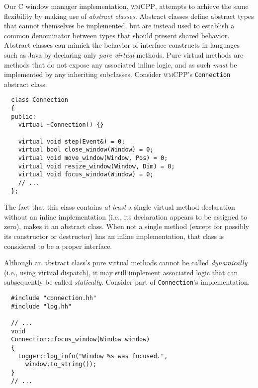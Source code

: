 Our  C\text{++}  window  manager  implementation,  \textsc{wmCPP},  attempts  to
achieve  the  same  flexibility  by making  use  of  \textit{abstract  classes}.
Abstract classes  define abstract types  that cannot themselves  be implemented,
but  are instead  used  to establish  a common  denominator  between types  that
should  present shared  behavior. Abstract  classes can  mimick the  behavior of
interface constructs  in languages such  as Java by declaring  only \textit{pure
virtual}  methods. Pure  virtual  methods are  methods that  do  not expose  any
associated  inline  logic, and  as  such  \textit{must}  be implemented  by  any
inheriting  subclasses.  Consider \textsc{wmCPP}'s  \texttt{Connection}
abstract class.


\begin{verbatim}
  class Connection
  {
  public:
    virtual ~Connection() {}
  
    virtual void step(Event&) = 0;
    virtual bool close_window(Window) = 0;
    virtual void move_window(Window, Pos) = 0;
    virtual void resize_window(Window, Dim) = 0;
    virtual void focus_window(Window) = 0;
    // ...
  };
\end{verbatim}

The fact  that this  class contains  \textit{at least}  a single  virtual method
declaration  without an  inline  implementation (i.e.,  its declaration  appears
to  be  assigned to  zero),  makes  it an  abstract  class.  When not  a  single
method  (except  for possibly  its  constructor  or  destructor) has  an  inline
implementation, that class is considered to be a proper interface.

Although   an  abstract   class's  pure   virtual  methods   cannot  be   called
\textit{dynamically}  (i.e., using  virtual  dispatch), it  may still  implement
associated logic  that can subsequently be  called \textit{statically}. Consider
part of \texttt{Connection}'s implementation.


\begin{verbatim}
  #include "connection.hh"
  #include "log.hh"

  // ...
  void
  Connection::focus_window(Window window)
  {
    Logger::log_info("Window %s was focused.",
      window.to_string());
  }
  // ...
\end{verbatim}

